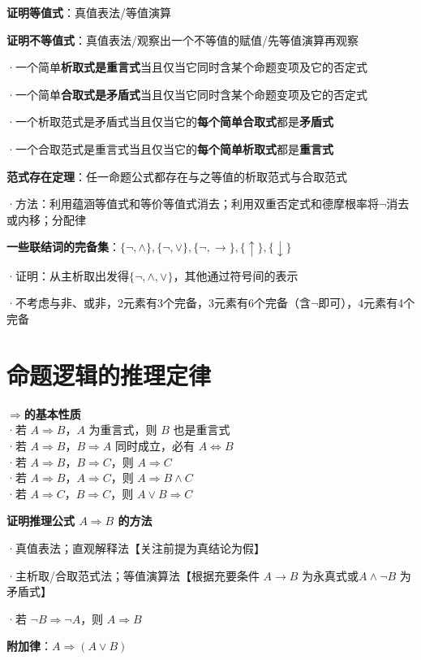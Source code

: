 \textbf{证明等值式}：真值表法/等值演算

\textbf{证明不等值式}：真值表法/观察出一个不等值的赋值/先等值演算再观察

·一个简单\textbf{析取式是重言式}当且仅当它同时含某个命题变项及它的否定式

·一个简单\textbf{合取式是矛盾式}当且仅当它同时含某个命题变项及它的否定式

·一个析取范式是矛盾式当且仅当它的\textbf{每个简单合取式}都是\textbf{矛盾式}

·一个合取范式是重言式当且仅当它的\textbf{每个简单析取式}都是\textbf{重言式}

\textbf{范式存在定理}：任一命题公式都存在与之等值的析取范式与合取范式

·方法：利用蕴涵等值式和等价等值式消去；利用双重否定式和德摩根率将$\lnot$消去或内移；分配律

\textbf{一些联结词的完备集}：$\{\lnot, \wedge\}, \{\lnot, \vee\}, \{\lnot, \rightarrow\}, \{\uparrow\}, \{\downarrow\}$

·证明：从主析取出发得$\{\lnot, \wedge, \vee\}$，其他通过符号间的表示

·不考虑与非、或非，2元素有3个完备，3元素有6个完备（含$\lnot$即可），4元素有4个完备

\section*{命题逻辑的推理定律}

\textbf{$\Rightarrow$的基本性质}\\
·若 $A \Rightarrow B$，$A$ 为重言式，则 $B$ 也是重言式\\
·若 $A \Rightarrow B$，$B \Rightarrow A$ 同时成立，必有 $A  \Leftrightarrow B$\\
·若 $A \Rightarrow B$，$B \Rightarrow C$，则 $A \Rightarrow C$\\
·若 $A \Rightarrow B$，$A \Rightarrow C$，则 $A \Rightarrow B \land C$\\
·若 $A \Rightarrow C$，$B \Rightarrow C$，则 $A \lor B \Rightarrow C$

\textbf{证明推理公式 $A \Rightarrow B$ 的方法}

·真值表法；直观解释法【关注前提为真结论为假】

·主析取/合取范式法；等值演算法【根据充要条件 $A \rightarrow B$ 为永真式或$A \land \neg B$ 为矛盾式】

·若 $\neg B \Rightarrow \neg A$，则 $A \Rightarrow B$

\textbf{附加律}：$A \Rightarrow (A \vee B)$

